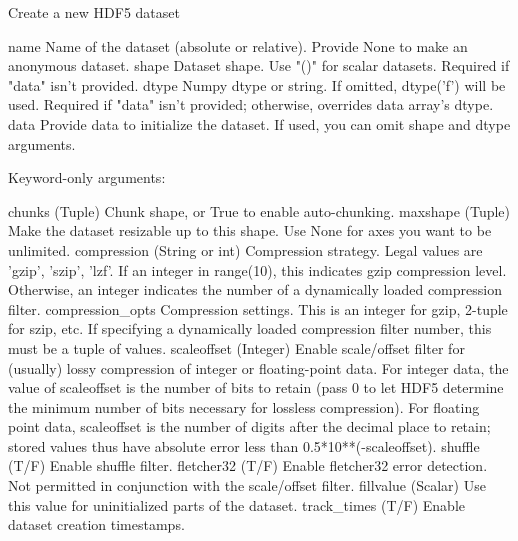 \begin{DoxyVerb}Create a new HDF5 dataset

name
    Name of the dataset (absolute or relative).  Provide None to make
    an anonymous dataset.
shape
    Dataset shape.  Use "()" for scalar datasets.  Required if "data"
    isn't provided.
dtype
    Numpy dtype or string.  If omitted, dtype('f') will be used.
    Required if "data" isn't provided; otherwise, overrides data
    array's dtype.
data
    Provide data to initialize the dataset.  If used, you can omit
    shape and dtype arguments.

Keyword-only arguments:

chunks
    (Tuple) Chunk shape, or True to enable auto-chunking.
maxshape
    (Tuple) Make the dataset resizable up to this shape.  Use None for
    axes you want to be unlimited.
compression
    (String or int) Compression strategy.  Legal values are 'gzip',
    'szip', 'lzf'.  If an integer in range(10), this indicates gzip
    compression level. Otherwise, an integer indicates the number of a
    dynamically loaded compression filter.
compression_opts
    Compression settings.  This is an integer for gzip, 2-tuple for
    szip, etc. If specifying a dynamically loaded compression filter
    number, this must be a tuple of values.
scaleoffset
    (Integer) Enable scale/offset filter for (usually) lossy
    compression of integer or floating-point data. For integer
    data, the value of scaleoffset is the number of bits to
    retain (pass 0 to let HDF5 determine the minimum number of
    bits necessary for lossless compression). For floating point
    data, scaleoffset is the number of digits after the decimal
    place to retain; stored values thus have absolute error
    less than 0.5*10**(-scaleoffset).
shuffle
    (T/F) Enable shuffle filter.
fletcher32
    (T/F) Enable fletcher32 error detection. Not permitted in
    conjunction with the scale/offset filter.
fillvalue
    (Scalar) Use this value for uninitialized parts of the dataset.
track_times
    (T/F) Enable dataset creation timestamps.
\end{DoxyVerb}
 \mbox{\label{classh5py__LOCAL_1_1__hl_1_1group_1_1Group_a5470e2bfa711591b6b8c23423c62ef78}} 
